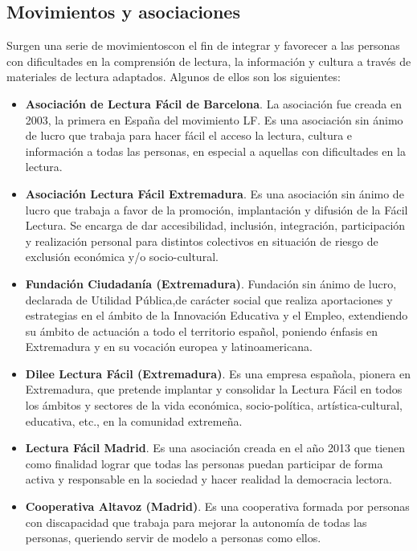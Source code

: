 \subsection{Movimientos y asociaciones}
Surgen una serie de movimientoscon el fin de integrar y favorecer a las personas con dificultades en la comprensión de lectura, la información y cultura a través de materiales de lectura adaptados. Algunos de ellos son los siguientes:
\begin{itemize}
	\item{\textbf{Asociación de Lectura Fácil de Barcelona}}\cite{LFBarcelona}. La asociación fue creada en 2003, la primera en España del movimiento LF. Es una asociación sin ánimo de lucro que trabaja para hacer fácil el acceso la lectura, cultura e información a todas las personas, en especial a aquellas con dificultades en la lectura. 
	
	\item{\textbf{Asociación Lectura Fácil Extremadura}}\cite{LFExtremadura}. Es una asociación sin ánimo de lucro que trabaja a favor de la promoción, implantación y difusión de la Fácil Lectura. Se encarga de  dar accesibilidad, inclusión, integración, participación y realización personal para distintos colectivos en situación de riesgo de exclusión económica y/o socio-cultural.
	
	\item{\textbf{Fundación Ciudadanía (Extremadura)}}\cite{LFFundacionCiudadania}. Fundación sin ánimo de lucro, declarada de Utilidad Pública,de carácter social que realiza aportaciones y estrategias en el ámbito de la Innovación Educativa y el Empleo, extendiendo su ámbito de actuación a todo el territorio español, poniendo énfasis en Extremadura y en su vocación europea y latinoamericana.
	
	\item{\textbf{Dilee Lectura Fácil (Extremadura)}}\cite{LFDilee}. Es una empresa española, pionera en Extremadura, que pretende implantar y consolidar la Lectura Fácil en todos los ámbitos y sectores de la vida económica, socio-política, artística-cultural, educativa, etc., en la comunidad extremeña.
	
	\item{\textbf{Lectura Fácil Madrid}}\cite{LFMadrid}. Es una asociación creada en el año 2013 que tienen como finalidad  lograr que todas las personas puedan participar de forma activa y responsable en la sociedad y hacer realidad la democracia lectora. 
	
	\item{\textbf{Cooperativa Altavoz (Madrid)}}\cite{LFCooperativaAltavoz}. Es una cooperativa formada por personas con discapacidad
	que trabaja para mejorar la autonomía de todas las personas, queriendo servir de modelo a personas como ellos.
	

\end{itemize}
